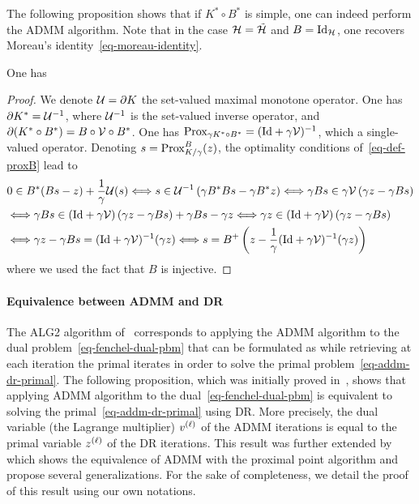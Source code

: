 
The following proposition shows that if $K^* \circ B^*$ is simple, one can indeed perform the ADMM algorithm. Note that in the case $\mathcal{H}=\tilde{\mathcal{H}}$ and  $B=\mathrm{Id}_{\mathcal{H}}$, one recovers Moreau's identity~\eqref{eq-moreau-identity}.

\begin{prop}\label{eq-proxB-proxD}
One has
\end{prop}
\begin{proof}
	We denote $\mathcal{U} = \partial K$ the set-valued maximal monotone operator. One has
	$\partial K^* = \mathcal{U}^{-1}$, where $\mathcal{U}^{-1}$ is the set-valued inverse operator, and $\partial (K^* \circ B^*) = B \circ\mathcal{V} \circ B^*$. 
	One has $\operatorname{Prox}_{\gamma K^* \circ B^* } = (\mathrm{Id} + \gamma \mathcal{V})^{-1}$, which a single-valued operator. 
	Denoting  $s = \operatorname{Prox}_{K/\gamma}^B(z)$, the optimality conditions of~\eqref{eq-def-proxB} lead to
	\begin{align}
		& 
		0 \in B^*( B s - z) + \frac{1}{\gamma} \mathcal{U}(s) 
		\Longleftrightarrow 
		s \in \mathcal{U}^{-1} \left(  \gamma B^* B s - \gamma B^* z    \right)
		\Longleftrightarrow 
		\gamma B s \in \gamma \mathcal{V}  \left(  \gamma z - \gamma B s     \right) \\
		& 
		\Longleftrightarrow
		\gamma B s \in ( \mathrm{Id} + \gamma \mathcal{V} )\left(  \gamma z - \gamma B s    \right) + \gamma B s - \gamma z 
		\Longleftrightarrow
		\gamma z \in ( \mathrm{Id} + \gamma \mathcal{V} )\left(  \gamma z - \gamma B s    \right) \\
		&
		\Longleftrightarrow
		\gamma z - \gamma B s = ( \mathrm{Id} + \gamma \mathcal{V} )^{-1}(\gamma z) 
		\Longleftrightarrow s = B^{+}\left(  z - \frac{1}{\gamma} ( \mathrm{Id} + \gamma \mathcal{V} )^{-1}(\gamma z)  \right)		
	\end{align}
	where we used the fact that $B$ is injective. 
\end{proof}

\paragraph{Equivalence between ADMM and DR}

The ALG2 algorithm of~\cite{Benamou2000} corresponds to applying the ADMM algorithm to the dual problem~\eqref{eq-fenchel-dual-pbm} that can be formulated as
while retrieving at each iteration the primal iterates in order to solve the primal problem~\eqref{eq-addm-dr-primal}. The following proposition, which was initially proved in~\cite{Gabay83}, shows that applying ADMM algorithm to the dual~\eqref{eq-fenchel-dual-pbm} is equivalent to solving the primal~\eqref{eq-addm-dr-primal} using DR. More precisely, the dual variable (the Lagrange multiplier) ${v}^{(\ell)}$ of the ADMM iterations is equal to the primal variable ${z}^{(\ell)}$ of the DR iterations. This result was further extended by~\cite{Eckstein1992} which shows the equivalence of ADMM with the proximal point algorithm and propose several generalizations. For the sake of completeness, we detail the proof of this result using our own notations. 


